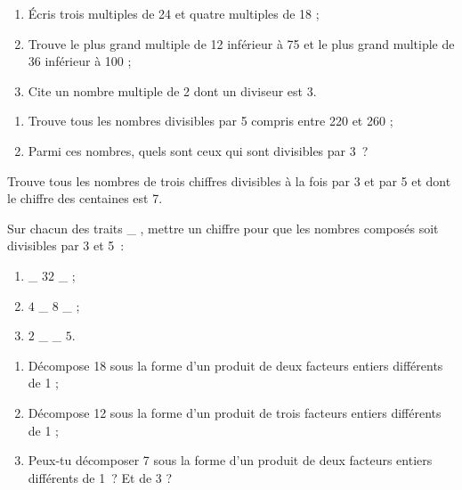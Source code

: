 \begin{exercice}
\begin{enumerate}
 \item Écris trois multiples de 24 et quatre multiples de 18 ;
 \item Trouve le plus grand multiple de 12 inférieur à 75 et le plus grand multiple de 36 inférieur à 100 ;
 \item Cite un nombre multiple de 2 dont un  diviseur est 3.
 \end{enumerate}
\end{exercice} 

\begin{exercice}[Liste]
\begin{enumerate}
 \item Trouve tous les nombres divisibles par 5 compris entre 220 et 260 ;
 \item Parmi ces nombres, quels sont ceux qui sont divisibles par 3 ?
 \end{enumerate}
\end{exercice} 

\begin{exercice}[Énigme]
Trouve tous les nombres de trois chiffres divisibles à la fois par 3 et par 5 et dont le chiffre des centaines est 7.
\end{exercice} 

\begin{exercice}
Sur chacun des traits \_ , mettre un chiffre pour que les nombres composés soit divisibles par 3 et 5 :
\begin{enumerate}
 \item \_ $32$ \_ ;
 \item $4$ \_ $8$ \_ ;
 \item $2$ \_ \_ $5$.
 \end{enumerate}
\end{exercice}


\begin{exercice}[Décompositions]
\begin{enumerate}
 \item Décompose 18 sous la forme d'un produit de deux facteurs entiers différents de 1 ;
 \item Décompose 12 sous la forme d'un produit de trois facteurs entiers différents de 1 ;
 \item Peux‑tu décomposer 7 sous la forme d'un produit de deux facteurs entiers différents de 1 ? Et de 3 ?
 \end{enumerate}
\end{exercice} 


